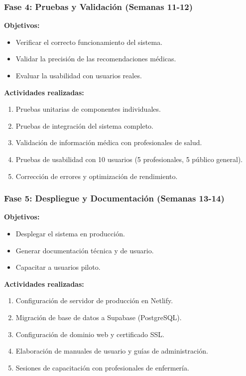 \documentclass[12pt,a4paper]{article}
\begin{document}
\subsubsection{Fase 4: Pruebas y Validación (Semanas 11-12)}

\textbf{Objetivos:}
\begin{itemize}
    \item Verificar el correcto funcionamiento del sistema.
    \item Validar la precisión de las recomendaciones médicas.
    \item Evaluar la usabilidad con usuarios reales.
\end{itemize}

\textbf{Actividades realizadas:}
\begin{enumerate}
    \item Pruebas unitarias de componentes individuales.
    \item Pruebas de integración del sistema completo.
    \item Validación de información médica con profesionales de salud.
    \item Pruebas de usabilidad con 10 usuarios (5 profesionales, 5 público general).
    \item Corrección de errores y optimización de rendimiento.
\end{enumerate}

\subsubsection{Fase 5: Despliegue y Documentación (Semanas 13-14)}

\textbf{Objetivos:}
\begin{itemize}
    \item Desplegar el sistema en producción.
    \item Generar documentación técnica y de usuario.
    \item Capacitar a usuarios piloto.
\end{itemize}

\textbf{Actividades realizadas:}
\begin{enumerate}
    \item Configuración de servidor de producción en Netlify.
    \item Migración de base de datos a Supabase (PostgreSQL).
    \item Configuración de dominio web y certificado SSL.
    \item Elaboración de manuales de usuario y guías de administración.
    \item Sesiones de capacitación con profesionales de enfermería.
\end{enumerate}
\end{document}
